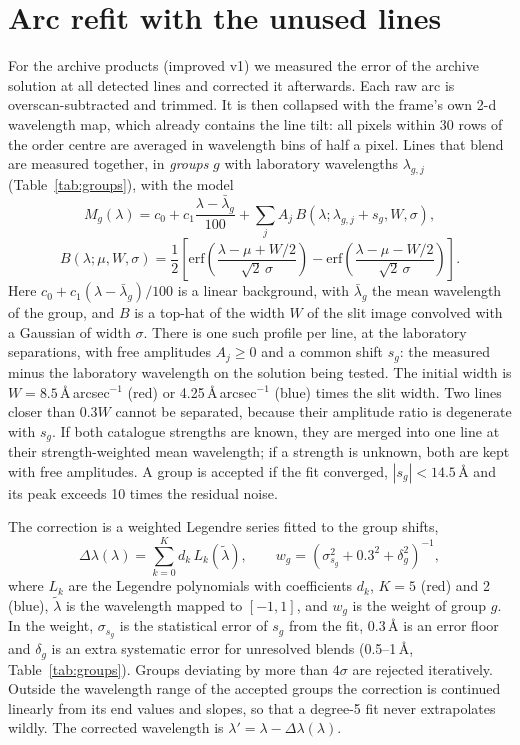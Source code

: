 \section{Arc refit with the unused lines}
\label{sec:wl_refit}
For the archive products (improved v1) we measured the error of the archive solution at all detected lines and
corrected it afterwards. Each raw arc is overscan-subtracted and trimmed. It is then collapsed with the frame's own
2-d wavelength map, which already contains the line tilt: all pixels within 30 rows of the order centre are averaged
in wavelength bins of half a pixel. Lines that blend are measured together, in \emph{groups} $g$ with laboratory
wavelengths $\lambda_{g,j}$ (Table~\ref{tab:groups}), with the model
\begin{equation}
M_g(\lambda) = c_0 + c_1\frac{\lambda-\bar\lambda_g}{100} + \sum_j A_j\,B(\lambda;\lambda_{g,j}+s_g,W,\sigma),
\label{eq:arcgroup}
\end{equation}
\begin{equation}
B(\lambda;\mu,W,\sigma)=\frac{1}{2}\left[\mathrm{erf}\!\left(\frac{\lambda-\mu+W/2}{\sqrt2\,\sigma}\right)
 -\mathrm{erf}\!\left(\frac{\lambda-\mu-W/2}{\sqrt2\,\sigma}\right)\right].
\label{eq:boxcar}
\end{equation}
Here $c_0+c_1(\lambda-\bar\lambda_g)/100$ is a linear background, with $\bar\lambda_g$ the mean wavelength of the
group, and $B$ is a top-hat of the width $W$ of the slit image convolved with a Gaussian of width $\sigma$. There is
one such profile per line, at the laboratory separations, with free amplitudes $A_j\ge0$ and a common shift $s_g$:
the measured minus the laboratory wavelength on the solution being tested. The initial width is
$W=8.5$\,\AA\,arcsec$^{-1}$ (red) or 4.25\,\AA\,arcsec$^{-1}$ (blue) times the slit width. Two lines closer than
$0.3W$ cannot be separated, because their amplitude ratio is degenerate with $s_g$. If both catalogue strengths are
known, they are merged into one line at their strength-weighted mean wavelength; if a strength is unknown, both are
kept with free amplitudes. A group is accepted if the fit converged, $|s_g|<14.5$\,\AA{} and its peak exceeds 10
times the residual noise.

The correction is a weighted Legendre series fitted to the group shifts,
\begin{equation}
\Delta\lambda(\lambda)=\sum_{k=0}^{K}d_k\,L_k(\tilde\lambda),\qquad
w_g = \left(\sigma_{s_g}^2+0.3^2+\delta_g^2\right)^{-1},
\label{eq:arccorr}
\end{equation}
where $L_k$ are the Legendre polynomials with coefficients $d_k$, $K=5$ (red) and 2 (blue), $\tilde\lambda$ is the
wavelength mapped to $[-1,1]$, and $w_g$ is the weight of group $g$. In the weight, $\sigma_{s_g}$ is the statistical
error of $s_g$ from the fit, 0.3\,\AA{} is an error floor and $\delta_g$ is an extra systematic error for
unresolved blends (0.5--1\,\AA{}, Table~\ref{tab:groups}). Groups deviating by more than $4\sigma$ are rejected
iteratively. Outside the wavelength range of the accepted groups the correction is continued linearly from its end
values and slopes, so that a degree-5 fit never extrapolates wildly. The corrected wavelength is
$\lambda'=\lambda-\Delta\lambda(\lambda)$.

